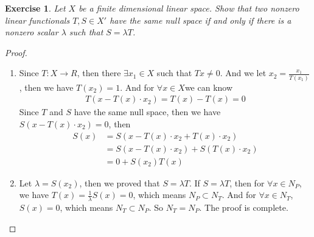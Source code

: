 \documentclass[11pt]{book}
\newtheorem{exercise}{Exercise}[section]
\theoremstyle{definition}
\numberwithin{equation}{subsection}
\begin{document}
\begin{exercise}
Let $X$ be a finite dimensional linear space. Show that two nonzero linear functionals $T,S\in X'$ have the same null space if and only if there is a nonzero scalar $\lambda$ such that $S = \lambda T$.
\end{exercise}
\begin{proof}
~\begin{enumerate}[label=(\arabic*)]
    \item Since $T: X \rightarrow R$, then there $\exists x_1 \in X$ such that $T x \neq 0$. And we let $x_2  = \frac{x_1}{T(x_1)}$, then we have $T(x_2) = 1$. And for $\forall x \in X$we can know
    \begin{align*}
        T(x - T(x)\cdot x_2) = T(x) - T(x) = 0
    \end{align*}
    Since $T$ and $S$ have the same null space, then we have $S(x - T(x)\cdot x_2) = 0$, then 
    \begin{align*}
        S(x) & = S(x - T(x)\cdot x_2 + T(x)\cdot x_2) \\
        & = S(x - T(x)\cdot x_2) + S(T(x)\cdot x_2) \\
        & = 0 + S(x_2) T(x)
    \end{align*}
    \item Let $\lambda = S(x_2)$, then we proved that $S = \lambda T$.
    If $S = \lambda T$, then for $\forall x \in N_P$, we have $T(x) = \frac{1}{\lambda} S(x) = 0$, which means $N_P \subset N_T$. And for $\forall x \in N_T$, $S(x) = 0$, which means $N_T \subset N_P$. So $N_T = N_P$. The proof is complete.
\end{enumerate}
\end{proof}

\medskip
\end{document}
